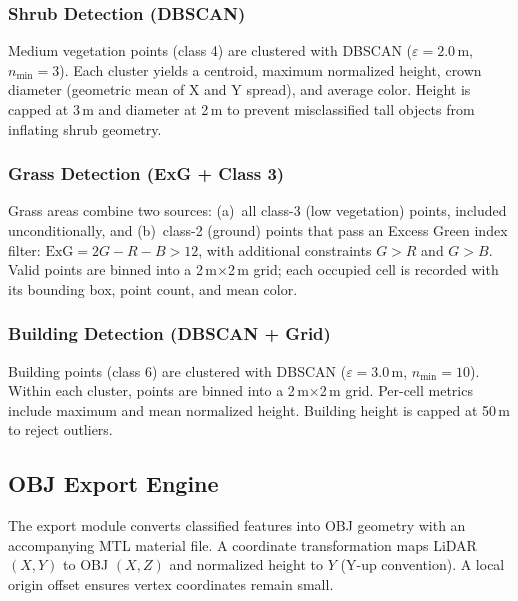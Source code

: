 \subsubsection{Shrub Detection (DBSCAN)}
Medium vegetation points (class 4) are clustered with DBSCAN ($\varepsilon=2.0$\,m, $n_{\min}=3$). Each cluster yields a centroid, maximum normalized height, crown diameter (geometric mean of X and Y spread), and average color. Height is capped at 3\,m and diameter at 2\,m to prevent misclassified tall objects from inflating shrub geometry.

\subsubsection{Grass Detection (ExG + Class 3)}
Grass areas combine two sources: (a)~all class-3 (low vegetation) points, included unconditionally, and (b)~class-2 (ground) points that pass an Excess Green index filter: $\text{ExG} = 2G - R - B > 12$, with additional constraints $G>R$ and $G>B$. Valid points are binned into a 2\,m$\times$2\,m grid; each occupied cell is recorded with its bounding box, point count, and mean color.

\subsubsection{Building Detection (DBSCAN + Grid)}
Building points (class 6) are clustered with DBSCAN ($\varepsilon=3.0$\,m, $n_{\min}=10$). Within each cluster, points are binned into a 2\,m$\times$2\,m grid. Per-cell metrics include maximum and mean normalized height. Building height is capped at 50\,m to reject outliers.

\subsection{OBJ Export Engine}

The export module converts classified features into OBJ geometry with an accompanying MTL material file. A coordinate transformation maps LiDAR $(X,Y)$ to OBJ $(X,Z)$ and normalized height to $Y$ (Y-up convention). A local origin offset ensures vertex coordinates remain small.

